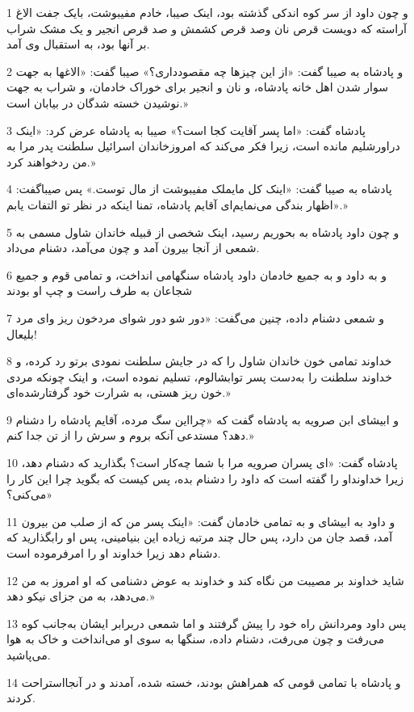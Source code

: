 \par 1 و چون داود از سر کوه اندکی گذشته بود، اینک صیبا، خادم مفیبوشت، بایک جفت الاغ آراسته که دویست قرص نان وصد قرص کشمش و صد قرص انجیر و یک مشک شراب بر آنها بود، به استقبال وی آمد.
\par 2 و پادشاه به صیبا گفت: «از این چیزها چه مقصودداری؟» صیبا گفت: «الاغها به جهت سوار شدن اهل خانه پادشاه، و نان و انجیر برای خوراک خادمان، و شراب به جهت نوشیدن خسته شدگان در بیابان است.»
\par 3 پادشاه گفت: «اما پسر آقایت کجا است؟» صیبا به پادشاه عرض کرد: «اینک دراورشلیم مانده است، زیرا فکر می‌کند که امروزخاندان اسرائیل سلطنت پدر مرا به من ردخواهند کرد.»
\par 4 پادشاه به صیبا گفت: «اینک کل مایملک مفیبوشت از مال توست.» پس صیباگفت: «اظهار بندگی می‌نمایم‌ای آقایم پادشاه، تمنا اینکه در نظر تو التفات یابم.»
\par 5 و چون داود پادشاه به بحوریم رسید، اینک شخصی از قبیله خاندان شاول مسمی به شمعی از آنجا بیرون آمد و چون می‌آمد، دشنام می‌داد.
\par 6 و به داود و به جمیع خادمان داود پادشاه سنگهامی انداخت، و تمامی قوم و جمیع شجاعان به طرف راست و چپ او بودند
\par 7 و شمعی دشنام داده، چنین می‌گفت: «دور شو دور شو‌ای مردخون ریز و‌ای مرد بلیعال!
\par 8 خداوند تمامی خون خاندان شاول را که در جایش سلطنت نمودی برتو رد کرده، و خداوند سلطنت را به‌دست پسر توابشالوم، تسلیم نموده است، و اینک چونکه مردی خون ریز هستی، به شرارت خود گرفتارشده‌ای.»
\par 9 و ابیشای ابن صرویه به پادشاه گفت که «چرااین سگ مرده، آقایم پادشاه را دشنام دهد؟ مستدعی آنکه بروم و سرش را از تن جدا کنم.»
\par 10 پادشاه گفت: «ای پسران صرویه مرا با شما چه‌کار است؟ بگذارید که دشنام دهد، زیرا خداونداو را گفته است که داود را دشنام بده، پس کیست که بگوید چرا این کار را می‌کنی؟»
\par 11 و داود به ابیشای و به تمامی خادمان گفت: «اینک پسر من که از صلب من بیرون آمد، قصد جان من دارد، پس حال چند مرتبه زیاده این بنیامینی، پس او رابگذارید که دشنام دهد زیرا خداوند او را امرفرموده است.
\par 12 شاید خداوند بر مصیبت من نگاه کند و خداوند به عوض دشنامی که او امروز به من می‌دهد، به من جزای نیکو دهد.»
\par 13 پس داود ومردانش راه خود را پیش گرفتند و اما شمعی دربرابر ایشان به‌جانب کوه می‌رفت و چون می‌رفت، دشنام داده، سنگها به سوی او می‌انداخت و خاک به هوا می‌پاشید.
\par 14 و پادشاه با تمامی قومی که همراهش بودند، خسته شده، آمدند و در آنجااستراحت کردند.
